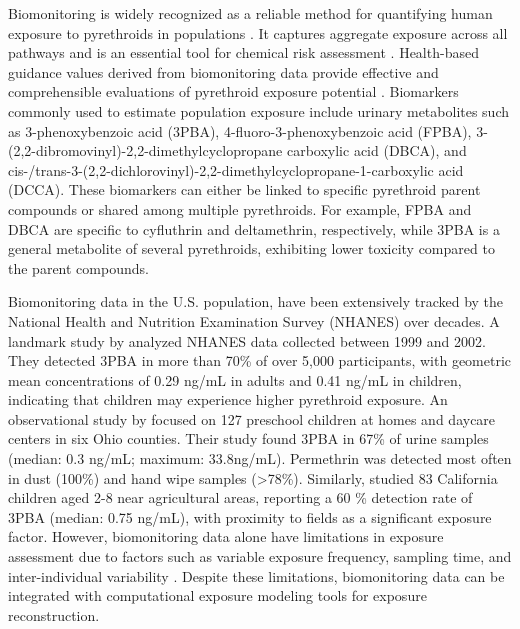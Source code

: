 \documentclass[toxics,article,submit,pdftex,moreauthors]{Definitions/mdpi}
\begin{document}
Biomonitoring is widely recognized as a reliable method for quantifying
human exposure to pyrethroids in populations
\citep{barr2010urinary, quindroit2021estimating, tarazona2022tiered}. It
captures aggregate exposure across all pathways and is an essential tool
for chemical risk assessment
\citep{blount2007perchlorate, sobus2015uses}. Health-based guidance
values derived from biomonitoring data provide effective and
comprehensible evaluations of pyrethroid exposure potential
\citep{apel2023human}. Biomarkers commonly used to estimate population
exposure include urinary metabolites such as 3-phenoxybenzoic acid
(3PBA), 4-fluoro-3-phenoxybenzoic acid (FPBA),
3-(2,2-dibromovinyl)-2,2-dimethylcyclopropane carboxylic acid (DBCA),
and
cis-/trans-3-(2,2-dichlorovinyl)-2,2-dimethylcyclopropane-1-carboxylic
acid (DCCA). These biomarkers can either be linked to specific
pyrethroid parent compounds or shared among multiple pyrethroids. For
example, FPBA and DBCA are specific to cyfluthrin and deltamethrin,
respectively, while 3PBA is a general metabolite of several pyrethroids,
exhibiting lower toxicity compared to the parent compounds.

Biomonitoring data in the U.S. population, have been extensively tracked by the
National Health and Nutrition Examination Survey (NHANES) over decades. A
landmark study by \citet{barr2010urinary} analyzed NHANES data collected
between 1999 and 2002. They detected 3PBA in more than 70\% of over 5,000
participants, with geometric mean concentrations of 0.29 ng/mL in adults and
0.41 ng/mL in children, indicating that children may experience higher
pyrethroid exposure. An observational study by \citet{morgan2007observational}
focused on 127 preschool children at homes and daycare centers in six Ohio
counties. Their study found 3PBA in 67\% of urine samples (median: 0.3 ng/mL;
maximum: 33.8ng/mL). Permethrin was detected most often in dust (100\%) and
hand wipe samples (>78\%). Similarly, \citet{trunnelle2014urinary} studied 83
California children aged 2-8 near agricultural areas, reporting a 60 \%
detection rate of 3PBA (median: 0.75 ng/mL), with proximity to fields as a
significant exposure factor. However, biomonitoring data alone have limitations
in exposure assessment due to factors such as variable exposure frequency,
sampling time, and inter-individual variability \citep{aylward2017variation}.
Despite these limitations, biomonitoring data can be integrated with
computational exposure modeling tools for exposure reconstruction.
\end{document}
